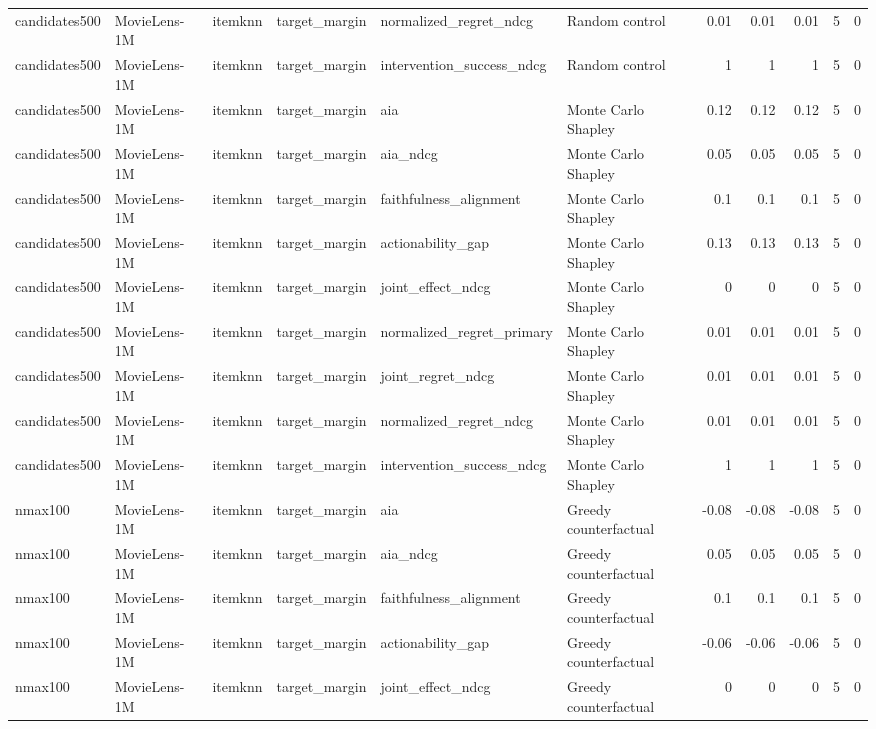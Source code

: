 \begin{table}[t]
{\begin{tabular}{llllllrrrrr}
candidates500 & MovieLens-1M & itemknn & target\_margin & normalized\_regret\_ndcg & Random control & 0.01 & 0.01 & 0.01 & 5 & 0 \\
candidates500 & MovieLens-1M & itemknn & target\_margin & intervention\_success\_ndcg & Random control & 1 & 1 & 1 & 5 & 0 \\
candidates500 & MovieLens-1M & itemknn & target\_margin & aia & Monte Carlo Shapley & 0.12 & 0.12 & 0.12 & 5 & 0 \\
candidates500 & MovieLens-1M & itemknn & target\_margin & aia\_ndcg & Monte Carlo Shapley & 0.05 & 0.05 & 0.05 & 5 & 0 \\
candidates500 & MovieLens-1M & itemknn & target\_margin & faithfulness\_alignment & Monte Carlo Shapley & 0.1 & 0.1 & 0.1 & 5 & 0 \\
candidates500 & MovieLens-1M & itemknn & target\_margin & actionability\_gap & Monte Carlo Shapley & 0.13 & 0.13 & 0.13 & 5 & 0 \\
candidates500 & MovieLens-1M & itemknn & target\_margin & joint\_effect\_ndcg & Monte Carlo Shapley & 0 & 0 & 0 & 5 & 0 \\
candidates500 & MovieLens-1M & itemknn & target\_margin & normalized\_regret\_primary & Monte Carlo Shapley & 0.01 & 0.01 & 0.01 & 5 & 0 \\
candidates500 & MovieLens-1M & itemknn & target\_margin & joint\_regret\_ndcg & Monte Carlo Shapley & 0.01 & 0.01 & 0.01 & 5 & 0 \\
candidates500 & MovieLens-1M & itemknn & target\_margin & normalized\_regret\_ndcg & Monte Carlo Shapley & 0.01 & 0.01 & 0.01 & 5 & 0 \\
candidates500 & MovieLens-1M & itemknn & target\_margin & intervention\_success\_ndcg & Monte Carlo Shapley & 1 & 1 & 1 & 5 & 0 \\
nmax100 & MovieLens-1M & itemknn & target\_margin & aia & Greedy counterfactual & -0.08 & -0.08 & -0.08 & 5 & 0 \\
nmax100 & MovieLens-1M & itemknn & target\_margin & aia\_ndcg & Greedy counterfactual & 0.05 & 0.05 & 0.05 & 5 & 0 \\
nmax100 & MovieLens-1M & itemknn & target\_margin & faithfulness\_alignment & Greedy counterfactual & 0.1 & 0.1 & 0.1 & 5 & 0 \\
nmax100 & MovieLens-1M & itemknn & target\_margin & actionability\_gap & Greedy counterfactual & -0.06 & -0.06 & -0.06 & 5 & 0 \\
nmax100 & MovieLens-1M & itemknn & target\_margin & joint\_effect\_ndcg & Greedy counterfactual & 0 & 0 & 0 & 5 & 0 \\

\end{tabular}}
\end{table}
